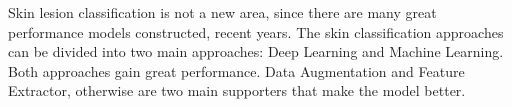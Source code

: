 \documentclass[sensors,article,accept,pdftex,moreauthors]{Definitions/mdpi}
\begin{document}
	
	{Skin lesion classification is not a new area, since there are many great performance models constructed, recent years. The skin classification approaches can be divided into two main approaches: Deep Learning and Machine Learning. Both approaches gain great performance. Data Augmentation and Feature Extractor, otherwise are two main supporters that make the model better.
		\begin{table}[H]
\caption{{Summary of related} %
works.}
\label{table:related-work-summary}


\end{table}}
\end{document}
